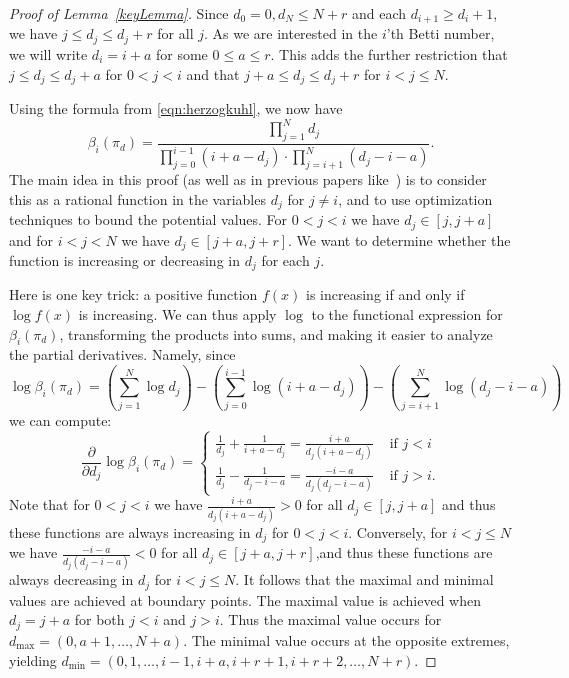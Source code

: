 \documentclass[12pt]{amsart}
\theoremstyle{remark}
\begin{document}
\begin{proof}[Proof of Lemma~\ref{keyLemma}]
Since $d_0= 0, d_N \leq N+r$ and each $d_{i+1} \geq d_i+1$, we have $j \leq d_j \leq d_j+r$ for all $j$.  As we are interested in the $i$'th Betti number, we will write $d_i = i+a$ for some $0\leq a \leq r$.    This adds the further restriction that $j\leq d_j \leq d_j+a$ for $0<j<i$ and that $j+a \leq d_j \leq d_j+r$ for $i<j\leq N$.

Using the formula from \eqref{eqn:herzogkuhl}, we now have
\[
\beta_i(\pi_d) = \frac{\prod_{j=1}^N d_j}{\prod_{j=0}^{i-1} (i+a-d_j)  \cdot \prod_{j=i+1}^{N} (d_j-i-a)}. 
\]
The main idea in this proof (as well as in previous papers like~\cite{erman-beh,mccullough,boocher-wigglesworth}) is to consider this as a rational function in the variables $d_j$ for $j\ne i$, and to use optimization techniques to bound the potential values.  For $0<j<i$ we have $d_j \in [j,j+a]$ and for $i<j<N$ we have $d_j \in [j+a, j+r]$.
We want to determine whether the function is increasing or decreasing in $d_j$ for each $j$.  

Here is one key trick: a positive function $f(x)$ is increasing if and only if $\log f(x)$ is increasing.  We can thus apply $\log$ to the functional expression for $ \beta_i(\pi_d)$, transforming the products into sums, and making it easier to analyze the partial derivatives.  Namely, since
\[
\log \beta_i(\pi_d) = \left( \sum_{j=1}^N \log d_j\right)  -\left( \sum_{ j=0}^{i-1} \log (i+a-d_j) \right) - \left( \sum_{j=i+1}^N \log (d_j-i-a) \right)
\]
we can compute:
\[
\frac{\partial}{\partial d_j} \log \beta_i(\pi_d) = 
\begin{cases}
\frac{1}{d_j} + \frac{1}{i+a-d_j} = \frac{i+a}{d_j(i+a-d_j)} & \text{ if } j < i\\
\frac{1}{d_j}  - \frac{1}{d_j-i-a} = \frac{-i-a}{d_j(d_j-i-a)}& \text{ if } j > i.
\end{cases}
\]
Note that for $0<j<i$ we have $\frac{i+a}{d_j(i+a-d_j)}>0$ for all $d_j \in [j,j+a]$ and thus these functions are always increasing in $d_j$ for $0<j<i$.  Conversely, for $i<j\leq N$ we have $ \frac{-i-a}{d_j(d_j-i-a)}<0$ for all $d_j \in [j+a, j+r]$,and thus  these functions are always decreasing in $d_j$ for $i<j\leq N$.  It follows that the maximal and minimal values are achieved at boundary points.  The maximal value is achieved when $d_j = j+a$ for both $j<i$ and $j>i$.  Thus the maximal value occurs for $d_{\max} = (0,a+1, \dots, N+a)$.  The minimal value occurs at the opposite extremes, yielding $d_{\min}=(0,1,\dots,i-1,i+a,i+r+1,i+r+2, \dots, N+r)$.  




\end{proof}
\end{document}
